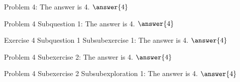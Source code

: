 \documentclass{ximera}
\begin{document}
\begin{problem}
    Problem 4: The answer is 4. $\answer{4}$
    \begin{question}
        Problem 4 Subquestion 1: The answer is 4. $\answer{4}$
        \begin{exercise}
            Exercise 4 Subquestion 1 Subsubexercise 1: The answer is 4. $\answer{4}$
        \end{exercise}
    \end{question}
    \begin{exercise}
        Problem 4 Subexercise 2: The answer is 4. $\answer{4}$
        \begin{exploration}
            Problem 4 Subexercise 2 Subsubexploration 1: The answer is 4. $\answer{4}$
        \end{exploration}
    \end{exercise}
\end{problem}


\hrulefill
\end{document}
